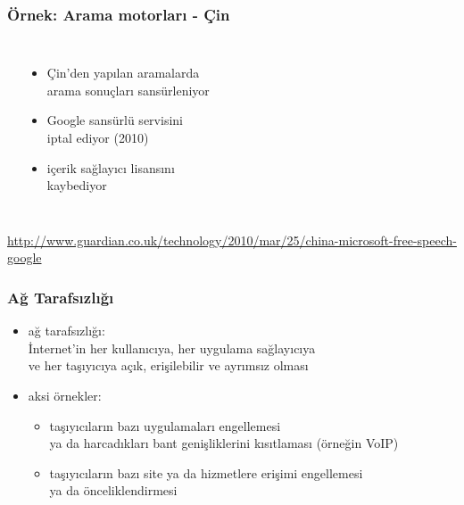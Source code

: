 \documentclass[dvipsnames]{beamer}
\theoremstyle{definition}
\theoremstyle{example}
\theoremstyle{plain}
\begin{document}
\begin{frame}
  \frametitle{Örnek: Arama motorları - Çin}

  \begin{columns}
    \begin{center}
    \end{center}

    \begin{itemize}
      \item Çin'den yapılan aramalarda\\
        arama sonuçları sansürleniyor
      \item Google sansürlü servisini\\
        iptal ediyor (2010)
      \item içerik sağlayıcı lisansını\\
        kaybediyor
    \end{itemize}
  \end{columns}

  \medskip
  \tiny{\url{http://www.guardian.co.uk/technology/2010/mar/25/china-microsoft-free-speech-google}}\\
\end{frame}

\begin{frame}
  \frametitle{Ağ Tarafsızlığı}

  \begin{itemize}
    \item \alert{ağ tarafsızlığı}:\\
      İnternet'in her kullanıcıya, her uygulama sağlayıcıya\\
      ve her taşıyıcıya açık, erişilebilir ve ayrımsız olması

    \medskip
    \item aksi örnekler:
    \begin{itemize}
      \item taşıyıcıların bazı uygulamaları engellemesi\\
        ya da harcadıkları bant genişliklerini kısıtlaması (örneğin VoIP)
      \item taşıyıcıların bazı site ya da hizmetlere erişimi engellemesi\\
        ya da önceliklendirmesi
    \end{itemize}
  \end{itemize}
\end{frame}
\end{document}
